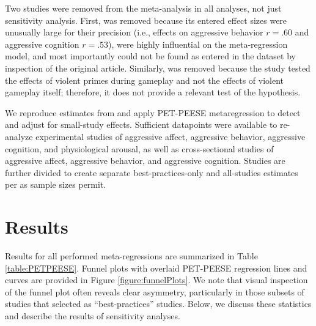 \documentclass[man]{apa6}
\begin{document}
Two studies were removed from the meta-analysis in all analyses, not just sensitivity analysis. First, \citet[study 1]{Matsuzaki:etal:2006} was removed because its entered effect sizes were unusually large for their precision (i.e., effects on aggressive behavior $r = .60$ and aggressive cognition $r = .53$), were highly influential on the meta-regression model, and most importantly could not be found as entered in the \citet{Anderson:etal:2010} dataset by inspection of the original article. %
Similarly, \citet{Panee:Ballard:2002} was removed because the study tested the effects of violent primes during gameplay and not the effects of violent gameplay itself; therefore, it does not provide a relevant test of the hypothesis. %

We reproduce estimates from \citet{Anderson:etal:2010} and apply PET-PEESE metaregression to detect and adjust for small-study effects. Sufficient datapoints were available to re-analyze experimental studies of aggressive affect, aggressive behavior, aggressive cognition, and physiological arousal, as well as cross-sectional studies of aggressive affect, aggressive behavior, and aggressive cognition. Studies are further divided to create separate best-practices-only and all-studies estimates per \citet{Anderson:etal:2010} as sample sizes permit. 


\section{Results}
Results for all performed meta-regressions are summarized in Table \ref{table:PETPEESE}. 
Funnel plots with overlaid PET-PEESE regression lines and curves are provided in Figure \ref{figure:funnelPlots}. We note that visual inspection of the funnel plot often reveals clear asymmetry, particularly in those subsets of studies that \citet{Anderson:etal:2010} selected as ``best-practices'' studies.
Below, we discuss these statistics and describe the results of sensitivity analyses.
\end{document}
